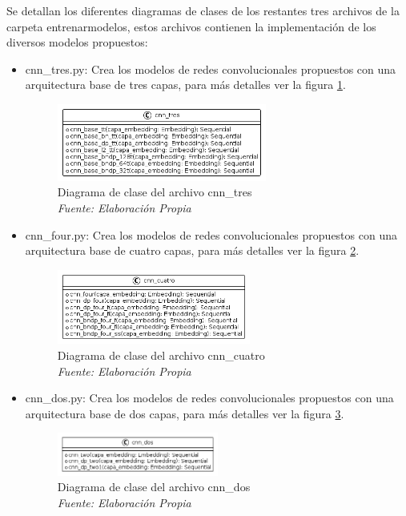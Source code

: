 Se detallan los diferentes diagramas de clases de los restantes tres archivos de la carpeta entrenarmodelos, estos archivos contienen la implementación de los diversos modelos propuestos:

\begin{itemize}

\item cnn\_tres.py: Crea los modelos de redes convolucionales propuestos con una arquitectura base de tres capas, para más detalles ver la figura \ref{fig:uml9}.

\begin{figure}[h!]
	\includegraphics[width=0.65\textwidth]{capitulo5/figuras/fig9.png}
	\caption{Diagrama de clase del archivo cnn\_tres
		\\\textit{Fuente: Elaboración Propia}}
	\label{fig:uml9}
\end{figure}

\item cnn\_four.py: Crea los modelos de redes convolucionales propuestos con una arquitectura base de cuatro capas, para más detalles ver la figura \ref{fig:uml10}.

\begin{figure}[h!]
	\includegraphics[width=0.6\textwidth]{capitulo5/figuras/fig10.png}
	\caption{Diagrama de clase del archivo cnn\_cuatro
		\\\textit{Fuente: Elaboración Propia}}
	\label{fig:uml10}
\end{figure}

\item cnn\_dos.py: Crea los modelos de redes convolucionales propuestos con una arquitectura base de dos capas, para más detalles ver la figura \ref{fig:uml11}.

\begin{figure}[h!]
	\includegraphics[width=0.5\textwidth]{capitulo5/figuras/fig11.png}
	\caption{Diagrama de clase del archivo cnn\_dos
		\\\textit{Fuente: Elaboración Propia}}
	\label{fig:uml11}
\end{figure}

\end{itemize}

